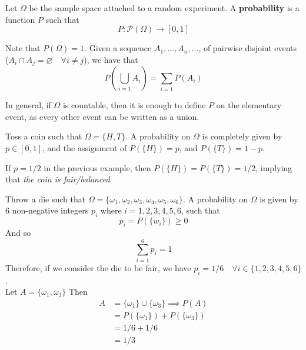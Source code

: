 \documentclass{article}
\begin{document}
	\begin{defn}
		Let $\Omega$ be the sample space attached to a random experiment. A \textbf{probability} is a function $P$ such that
		$$ P: \mathcal{P}(\Omega) \to [0,1]$$
	\end{defn}
	Note that $P(\Omega)=1$. Given a sequence $A_1, \dots, A_n, \dots$, of pairwise disjoint events ($A_i \cap A_j = \varnothing \quad \forall i \neq j$), we have that 
	$$ P \left(  \bigcup_{i =1} A_i\right) = \sum_{i =1} P (A_i)$$
	\begin{rem}
		In general, if $\Omega$ is countable, then it is enough to define $P$ on the elementary event, as every other event can be written as a union.
	\end{rem}
	\begin{exmp}
		Toss a coin such that $\Omega = \{ H, T \}$. A probability on $\Omega$ is completely given by $p \in [0,1]$, and the assignment of $P(\{H\}) = p$, and $P(\{T\}) = 1-p$.
	\end{exmp}
	\begin{rem}
		If $p=1/2$ in the previous example, then $P(\{H\}) = P(\{T\}) = 1/2$, implying that \emph{the coin is fair/balanced}.
	\end{rem}
	\begin{exmp}
		Throw a die such that $\Omega = \{ \omega_1, \omega_2, \omega_3, \omega_4, \omega_5, \omega_6 \}$. A probability on $\Omega$ is given by 6 non-negative integers $p_i$ where $i=1,2,3,4,5,6$, such that
		$$ p_i = P(\{w_i\}) \geq 0$$
		And so
		$$ \sum_{i=1}^6 p_i = 1$$
		Therefore, if we consider the die to be fair, we have $p_i = 1/6 \quad \forall i \in \{ 1,2,3,4,5,6 \}$. \\ Let $A = \{ \omega_1, \omega_3\}$ Then
		\begin{align*}
		 A &= \{ \omega_1\} \cup \{ \omega_3 \} \implies P(A) \\ 
		 &= P(\{ \omega_1 \}) + P(\{ \omega_3 \}) \\
		 &= 1/6 + 1/6 \\
		 &= 1/3
		\end{align*} 
	\end{exmp}
\end{document}

